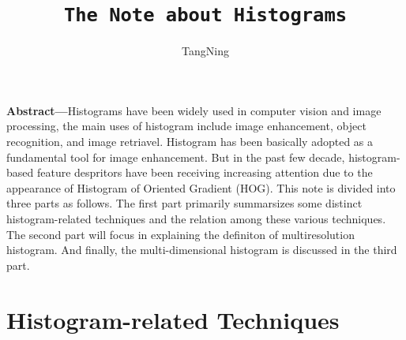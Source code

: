 \documentclass{article}
\title{\texttt{The Note about Histograms}}
\author{TangNing}
\begin{document}
\date{}
\maketitle

\textbf{Abstract---}Histograms have been widely used in computer vision and image processing, the main uses of histogram include image enhancement, object recognition,  and image retriavel. Histogram has been basically adopted as a fundamental tool for image enhancement. But in the past few decade, histogram-based feature despritors have been receiving increasing attention due to the appearance of Histogram of Oriented Gradient (HOG). This note is divided into three parts as follows. The first part primarily summarsizes some distinct histogram-related techniques and the relation among these various techniques. The second part will focus in explaining the definiton of multiresolution histogram. And finally, the multi-dimensional histogram is discussed in the third part.
\section{Histogram-related Techniques}
\end{document}
